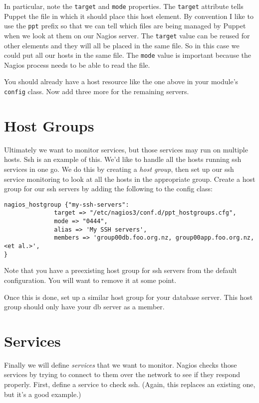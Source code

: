 \documentclass{article}         %
\begin{document}
In particular, note the \texttt{target} and \texttt{mode} properties. The \texttt{target} attribute tells Puppet the file in which it should place this host element. By convention I like to use the \texttt{ppt} prefix so that we can tell which files are being managed by Puppet when we look at them on our Nagios server. The \texttt{target} value can be reused for other elements and they will all be placed in the same file. So in this case we could put all our hosts in the same file. The \texttt{mode} value is important because the Nagios process needs to be able to read the file.

You should already have a host resource like the one above in your module's \texttt{config} class. Now add three more for the remaining servers.

\section{Host Groups}
Ultimately we want to monitor services, but those services may run on multiple hosts. Ssh is an example of this. We'd like to handle all the hosts running ssh services in one go. We do this by creating a \emph{host group}, then set up our ssh service monitoring to look at all the hosts in the appropriate group. Create a host group for our ssh servers by adding the following to the config class:

\begin{verbatim}
nagios_hostgroup {"my-ssh-servers":
              target => "/etc/nagios3/conf.d/ppt_hostgroups.cfg",
              mode => "0444", 
              alias => 'My SSH servers',
              members => 'group00db.foo.org.nz, group00app.foo.org.nz, <et al.>',
}
\end{verbatim}

Note that you have a preexisting host group for ssh servers from the default configuration. You will want to remove it at some point.

Once this is done, set up a similar host group for your database server. This host group should only have your db server as a member.

\newpage

\section{Services}
Finally we will define \emph{services} that we want to monitor. Nagios checks those services by trying to connect to them over the network to see if they respond properly. First, define a service to check ssh. (Again, this replaces an existing one, but it's a good example.)
\end{document}
